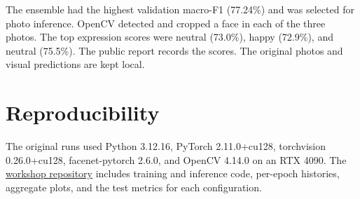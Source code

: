 \documentclass[10pt,letterpaper]{article}
\newcommand{\metric}[1]{#1\%}
\begin{document}
The ensemble had the highest validation macro-F1 (\metric{77.24}) and was selected for photo inference. OpenCV detected and cropped a face in each of the three photos. The top expression scores were neutral (\metric{73.0}), happy (\metric{72.9}), and neutral (\metric{75.5}). The public report records the scores. The original photos and visual predictions are kept local.

\section{Reproducibility}

The original runs used Python 3.12.16, PyTorch 2.11.0+cu128, torchvision 0.26.0+cu128, facenet-pytorch 2.6.0, and OpenCV 4.14.0 on an RTX 4090. The \href{https://github.com/FakeForest/AffectNet2013}{workshop repository} includes training and inference code, per-epoch histories, aggregate plots, and the test metrics for each configuration.
\end{document}
